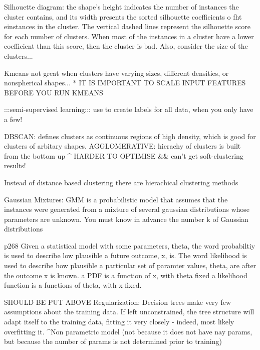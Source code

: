 Silhouette diagram:
the shape's height indicates the number of instances
the cluster contains, and its width presents the sorted silhouette coefficients o fht einstances in the cluster.
The vertical dashed lines represent the silhouette score for each number of clusters.
When most of the instances in a cluster have a lower coefficient than this score,
then the cluster is bad.
Also, consider the size of the clusters...

Kmeans not great when clusters have varying sizes,
different densities,
or nonspherical shapes...
* IT IS IMPORTANT TO SCALE INPUT FEATURES BEFORE YOU RUN KMEANS

:::semi-supervised learning:::
use to create labels for all data, when you only have a few!

DBSCAN: defines clusters as continuous regions of high density, which is good for clusters of arbitary shapes.
AGGLOMERATIVE: hierachy of clusters is built from the bottom up
^ HARDER TO OPTIMISE
&& can't get soft-clustering results!

Instead of distance based clustering
there are hierachical clustering methods


Gaussian Mixtures:
GMM is a probabilistic model that assumes that the instances were generated from a mixture of several gaussian distributions
whose parameters are unknown.
You must know in advance the number k of Gaussian distributions

p268
Given a statistical model with some parameters, theta, the word probabiltiy is used to describe low plausible a future outcome, x, is.
The word likelihood is used to describe how plausible a particular set of paramter values, theta, are after the outcome x is known.
a PDF is a function of x, with theta fixed
a likelihood function is a functions of theta, with x fixed.







SHOULD BE PUT ABOVE Regularization:
Decision trees make very few assumptions about the training data.
If left unconstrained,
the tree structure will adapt itself to the training data,
fitting it very closely - indeed, most likely overfitting it.
^Non parametric model
(not because it does not have nay params,
but because the number of params is not determined prior to training)

